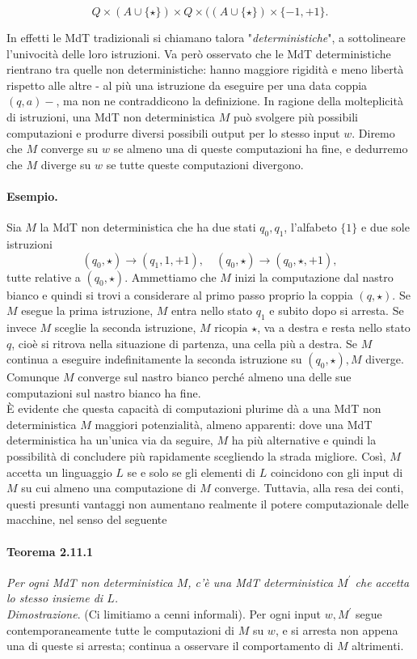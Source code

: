 $$
    Q \times(A \cup\{\star\}) \times Q \times((A \cup\{\star\}) \times\{-1,+1\} .
$$

In effetti le MdT tradizionali si chiamano talora "\textit{deterministiche}", a sottolineare
l'univocità delle loro istruzioni. Va però osservato che le MdT deterministiche
rientrano tra quelle non deterministiche: hanno maggiore rigidità e meno libertà
rispetto alle altre - al più una istruzione da eseguire per una data coppia $(q,
    a)-$, ma non ne contraddicono la definizione. In ragione della molteplicità di
istruzioni, una MdT non deterministica $M$ può svolgere più possibili computazioni e
produrre diversi possibili output per lo stesso input $w$. Diremo che $M$ converge su
$w$ se almeno una di queste computazioni ha fine, e dedurremo che $M$ diverge su $w$
se tutte queste computazioni divergono.

\paragraph{Esempio.} Sia $M$ la MdT non deterministica
che ha due stati $q_0, q_1$, l'alfabeto $\{1\}$ e due sole istruzioni
$$
    \left(q_0, \star\right) \rightarrow\left(q_1, 1,+1\right), \quad\left(q_0, \star\right) \rightarrow\left(q_0, \star,+1\right),
$$
tutte relative a $\left(q_0, \star\right)$. Ammettiamo che $M$ inizi la computazione
dal nastro bianco e quindi si trovi a considerare al primo passo proprio la coppia
$(q, \star)$. Se $M$ esegue la prima istruzione, $M$ entra nello stato $q_1$ e subito
dopo si arresta. Se invece $M$ sceglie la seconda istruzione, $M$ ricopia $\star$, va
a destra e resta nello stato $q$, cioè si ritrova nella situazione di partenza, una
cella più a destra. Se $M$ continua a eseguire indefinitamente la seconda istruzione
su $(q_0, \star), M$ diverge. Comunque $M$ converge sul nastro bianco
perché almeno una delle sue computazioni sul nastro bianco ha fine.\\

È evidente che questa capacità di computazioni plurime dà a una MdT non
deterministica $M$ maggiori potenzialità, almeno apparenti: dove una MdT
deterministica ha un'unica via da seguire, $M$ ha più alternative e quindi la
possibilità di concludere più rapidamente scegliendo la strada migliore. Così, $M$
accetta un linguaggio $L$ se e solo se gli elementi di $L$ coincidono con gli input
di $M$ su cui almeno una computazione di $M$ converge. Tuttavia, alla resa dei conti,
questi presunti vantaggi non aumentano realmente il potere computazionale delle
macchine, nel senso del seguente

\paragraph{Teorema 2.11.1} \textit{Per ogni MdT non deterministica $M$, c'è una MdT deterministica
    $M^{\prime}$ che accetta lo stesso insieme di $L$.}\\

\textit{Dimostrazione}. (Ci limitiamo a cenni informali). Per ogni input $w, M^{\prime}$ segue
contemporaneamente tutte le computazioni di $M$ su $w$, e si arresta non appena una
di queste si arresta; continua a osservare il comportamento di $M$ altrimenti.